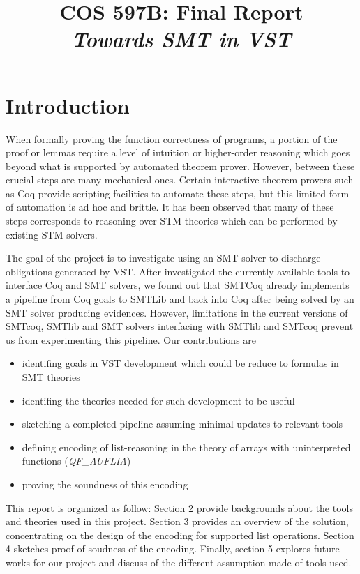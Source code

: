 \documentclass[onecolumn, preprint]{sigplanconf}
\title{COS 597B: Final Report\\
\emph{Towards SMT in VST}}
\begin{document}
\maketitle


\section{Introduction}
When formally proving the function correctness of programs, a portion of the proof or lemmas require a level of intuition or higher-order reasoning which goes beyond what is supported by automated theorem prover. However, between these crucial steps are many mechanical ones. Certain interactive theorem provers such as Coq provide scripting facilities to automate these steps, but this limited form of automation is ad hoc and brittle. It has been observed that many of these steps corresponds to reasoning over STM theories which can be performed by existing STM solvers. 

The goal of the project is to investigate using an SMT solver to discharge obligations generated by VST. After investigated the currently available tools to interface Coq and SMT solvers, we found out that SMTCoq already implements a pipeline from Coq goals to SMTLib and back into Coq after being solved by an SMT solver producing evidences. However, limitations in the current versions of SMTcoq, SMTlib and SMT solvers interfacing with SMTlib and SMTcoq prevent us from experimenting this pipeline. Our contributions are
\begin{itemize}
 \item identifing goals in VST development which could be reduce to formulas in SMT theories
 \item identifing the theories needed for such development to be useful
 \item sketching a completed pipeline assuming minimal updates to relevant tools
 \item defining encoding of list-reasoning in the theory of arrays with uninterpreted functions (\emph{QF\_AUFLIA})
 \item proving the soundness of this encoding
\end{itemize}

This report is organized as follow: Section 2 provide backgrounds about the tools and theories used in this project. Section 3 provides an overview of the solution, concentrating on the design of the encoding for supported list operations. Section 4 sketches proof of soudness of the encoding. Finally, section 5 explores future works for our project and discuss of the different assumption made of tools used.
\end{document}
